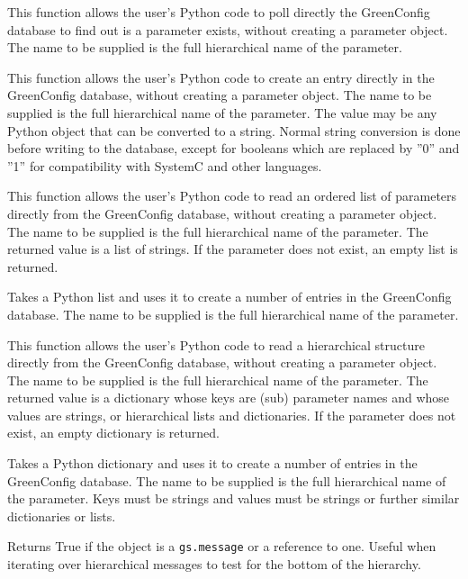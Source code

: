 \documentclass[12pt,oneside]{gsbook}
\begin{document}
 {This function allows the user's Python code to poll
directly the GreenConfig database to find out is a parameter exists, without
creating a parameter object.
The name to be supplied is the full hierarchical name of the parameter.}

 {This function allows the user's Python code to
create an entry directly in the GreenConfig database, without
creating a parameter object.
The name to be supplied is the full hierarchical name of the parameter.  The value
may be any Python object that can be converted to a string.  Normal string
conversion is done before writing to the database, except for booleans which
are replaced by ''0'' and ''1'' for compatibility with SystemC and other
languages.}

 {This function allows the user's Python code to read an
ordered list of parameters
directly from the GreenConfig database, without creating a parameter object.
The name to be supplied is the full hierarchical name of the parameter.  The
returned value is a list of strings.  If the parameter does not exist, an
empty list is returned.}

 {Takes a Python list and uses
it to create a number of entries in the GreenConfig database. The name to be
supplied is the full hierarchical name of the parameter.}

 {This function allows the user's Python code to read a
hierarchical structure directly from the GreenConfig database, without creating a parameter object.
The name to be supplied is the full hierarchical name of the parameter.  The
returned value is a dictionary whose keys are (sub) parameter names and whose
values are strings, or hierarchical lists and dictionaries.  If the parameter does not exist, an
empty dictionary is returned.}

 {Takes a Python dictionary and uses
it to create a number of entries in the GreenConfig database. The name to be
supplied is the full hierarchical name of the parameter.  Keys must be strings
and values must be strings or further similar dictionaries or lists.}


 {Returns True if the object is a \texttt{gs.message}
or a reference to one.  Useful when iterating over hierarchical
messages to test for the bottom of the hierarchy.}
\end{document}
